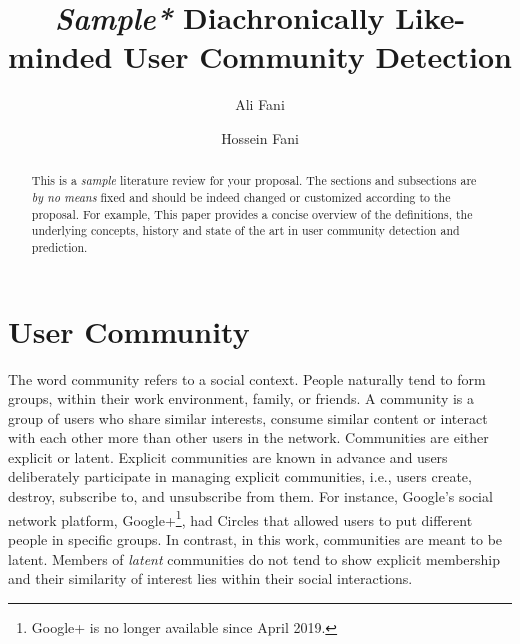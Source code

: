\documentclass[sigconf]{acmart}
\begin{document}
\title{\textit{Sample*} Diachronically Like-minded User Community Detection}
\author{Ali Fani}
\author{Hossein Fani}
\begin{abstract}
{\color{blue}This is a \textit{sample} literature review for your proposal. The sections and subsections are \textit{by no means} fixed and should be indeed changed or customized according to the proposal. For example,} This paper provides a concise overview of the definitions, the underlying concepts, history and state of the art in user community detection and prediction.
\end{abstract}
\maketitle


\section{User Community}
The word community refers to a social context. People naturally tend to form groups, within their work environment, family, or friends. A community is a group of users who share similar interests, consume similar content or interact with each other more than other users in the network. Communities are either explicit or latent. Explicit communities are known in advance and users deliberately participate in managing explicit communities, i.e., users create, destroy, subscribe to, and unsubscribe from them. For instance, Google's social network platform, Google+\footnote{Google+ is no longer available since April 2019.}, had Circles that allowed users to put different people in specific groups. {\color{red} In contrast, in this work, communities are meant to be latent. Members of \textit{latent} communities do not tend to show explicit membership and their similarity of interest lies within their social interactions.}
\end{document}
